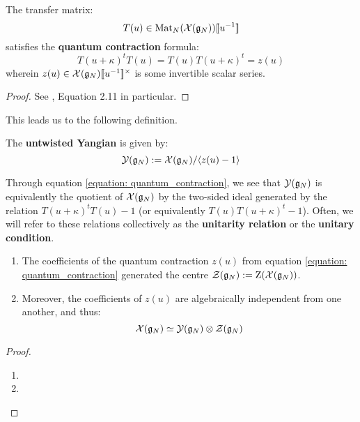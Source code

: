             \begin{lemma} \label{lemma: quantum_contractions}
                The transfer matrix:
                    $$T(u) \in \mathrm{Mat}_N( \mathcal{X}(\mathfrak{g}_N) )[\![u^{-1}]\!]$$
                satisfies the \textbf{quantum contraction} formula:
                    \begin{equation} \label{equation: quantum_contraction}
                        T(u + \kappa)^t T(u) = T(u) T(u + \kappa)^t = z(u)
                    \end{equation}
                wherein $z(u) \in \calX(\g_N)[\![u^{-1}]\!]^{\x}$ is some invertible scalar series.
            \end{lemma}
                \begin{proof}
                    See \cite[Section 2]{guay_regelskis_twisted_yangians_for_symmetric_pairs_of_types_BCD}, Equation 2.11 in particular.
                \end{proof}
                
            This leads us to the following definition.
            \begin{definition} \label{def: untwisted_yangians}
                The \textbf{untwisted Yangian} is given by:
                    $$\mathcal{Y}(\mathfrak{g}_N) := \mathcal{X}(\mathfrak{g}_N)/\langle z(u) - 1\rangle$$
            \end{definition}
            \begin{remark}[Unitarity]
                Through equation \eqref{equation: quantum_contraction}, we see that $\mathcal{Y}(\mathfrak{g}_N)$ is equivalently the quotient of $\mathcal{X}(\mathfrak{g}_N)$ by the two-sided ideal generated by the relation $T(u + \kappa)^t T(u) - 1$ (or equivalently $T(u) T(u + \kappa)^t - 1$). Often, we will refer to these relations collectively as the \textbf{unitarity relation} or the \textbf{unitary condition}.
            \end{remark}
            \begin{lemma} \label{lemma: centres_of_extended_untwisted_yangians}
                \begin{enumerate}
                    \item The coefficients of the quantum contraction $z(u)$ from equation \eqref{equation: quantum_contraction} generated the centre $\mathcal{Z}(\mathfrak{g}_N) := \mathrm{Z}( \mathcal{X}(\mathfrak{g}_N) )$.
                    \item Moreover, the coefficients of $z(u)$ are algebraically independent from one another, and thus:
                        $$\calX(\g_N) \cong \calY(\g_N) \tensor \calZ(\g_N)$$
                \end{enumerate}
            \end{lemma}
                \begin{proof}
                    \begin{enumerate}
                        \item 
                        \item 
                    \end{enumerate}
                \end{proof}

